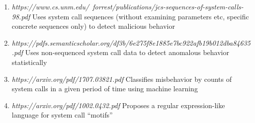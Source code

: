 \documentclass{article}
\begin{document}
\begin{enumerate}
    \item{\textit{https://www.cs.unm.edu/~forrest/publications/jcs-sequences-of-system-calls-98.pdf}\break
        Uses system call sequences (without examining parameters etc, specific concrete
        sequences only) to detect malicious behavior}
    \item{\textit{https://pdfs.semanticscholar.org/df3b/6e275f8e1885e7bc922afb19b012dba84635.pdf}\break
Uses non-sequenced system call data to detect anomalous behavior
        statistically}
    \item{\textit{https://arxiv.org/pdf/1707.03821.pdf}\break
Classifies misbehavior by counts of system calls in a given period of time using
        machine learning}
    \item{\textit{https://arxiv.org/pdf/1002.0432.pdf}\break
        Proposes a regular expression-like language for system call “motifs”}
\end{enumerate}
\end{document}
